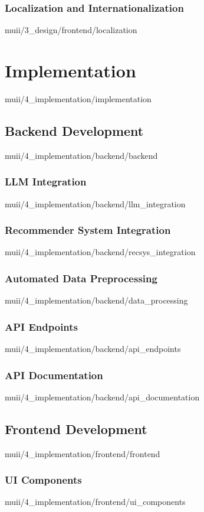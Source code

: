 \documentclass[english,epsbased,copyright,final,printable,covers,extendedindex,firstnumbered,tfm,gnuplot,loc,lof,lot]{tfgtfmthesisuam}
\begin{document}
      \subsection{Localization and Internationalization\label{SS:LOCALINTER}}{muii/3_design/frontend/localization}

  \chapter{Implementation\label{CAP:IMPLEMENTATION}}{muii/4_implementation/implementation}
    \section{Backend Development\label{SEC:BACKDEV}}{muii/4_implementation/backend/backend}
      \subsection{LLM Integration\label{SS:LLMINTEG}}{muii/4_implementation/backend/llm_integration}
      \subsection{Recommender System Integration\label{SS:RECSYSINTEG}}{muii/4_implementation/backend/recsys_integration}
      \subsection{Automated Data Preprocessing\label{SS:AUTODATAPREPROC}}{muii/4_implementation/backend/data_processing}
      \subsection{API Endpoints\label{SS:ENDPOINTS}}{muii/4_implementation/backend/api_endpoints}
      \subsection{API Documentation\label{SS:DOCS}}{muii/4_implementation/backend/api_documentation}

    \section{Frontend Development\label{SEC:FRONTDEV}}{muii/4_implementation/frontend/frontend}
      \subsection{UI Components\label{SS:UICOMPS}}{muii/4_implementation/frontend/ui_components}
\end{document}
